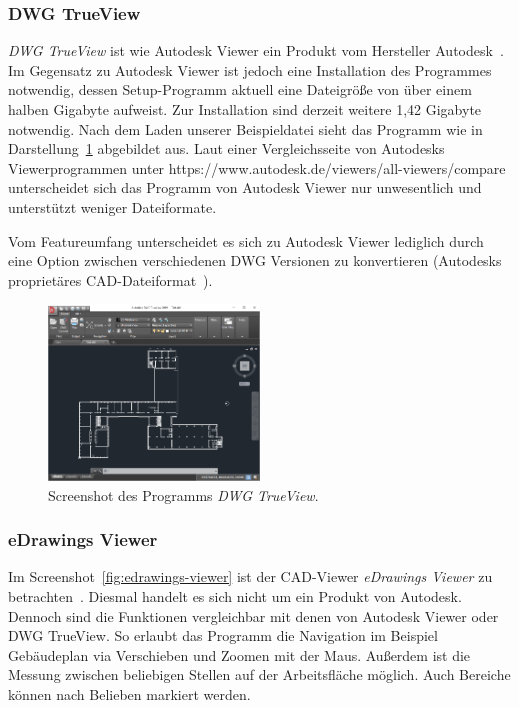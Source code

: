 \subsubsection{DWG TrueView}
\label{subsubsec:dwg-trueview}

\textit{DWG TrueView} ist wie Autodesk Viewer ein Produkt vom Hersteller Autodesk~\cite{DWGTrueView}.
Im Gegensatz zu Autodesk Viewer ist jedoch eine Installation des Programmes notwendig, dessen Setup-Programm aktuell eine Dateigröße von über einem halben Gigabyte aufweist.
Zur Installation sind derzeit weitere 1,42 Gigabyte notwendig.
Nach dem Laden unserer Beispieldatei sieht das Programm wie in Darstellung~\ref{fig:dwg-trueview} abgebildet aus.
Laut einer Vergleichsseite von Autodesks Viewerprogrammen unter https://www.autodesk.de/viewers/all-viewers/compare unterscheidet sich das Programm von Autodesk Viewer nur unwesentlich und unterstützt weniger Dateiformate.

Vom Featureumfang unterscheidet es sich zu Autodesk Viewer lediglich durch eine Option zwischen verschiedenen DWG Versionen zu konvertieren (Autodesks proprietäres CAD-Dateiformat~\cite{DWGTrueView}).

\begin{figure}
    \includegraphics[width=0.5\textwidth]{res/dwg-trueviewer.png}
    \caption{Screenshot des Programms \textit{DWG TrueView}.}
    \label{fig:dwg-trueview}
\end{figure}

\subsubsection{eDrawings Viewer}
\label{subsubsec:edrawings-viewer}

Im Screenshot~\ref{fig:edrawings-viewer} ist der CAD-Viewer \textit{eDrawings Viewer} zu betrachten~\cite{eDrawingsViewer}.
Diesmal handelt es sich nicht um ein Produkt von Autodesk.
Dennoch sind die Funktionen vergleichbar mit denen von Autodesk Viewer oder DWG TrueView.
So erlaubt das Programm die Navigation im Beispiel Gebäudeplan via Verschieben und Zoomen mit der Maus.
Außerdem ist die Messung zwischen beliebigen Stellen auf der Arbeitsfläche möglich.
Auch Bereiche können nach Belieben markiert werden.

